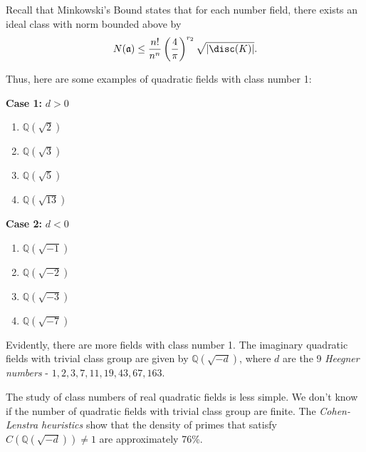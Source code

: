 \documentclass[a4paper, 12pt,oneside,openany]{book}
\begin{document}
Recall that Minkowski's Bound states that for each number field, there exists an ideal class with norm bounded above by $$N(\mathfrak{a})\leq\frac{n!}{n^n}\left(\frac{4}{\pi}\right)^{r_2} \sqrt{|\disc(K)|}.$$

Thus, here are some examples of quadratic fields with class number 1:

\textbf{Case 1:} $d>0$
\begin{enumerate}
    \item $\mathbb{Q}(\sqrt{2})$
    \item $\mathbb{Q}(\sqrt{3})$
    \item $\mathbb{Q}(\sqrt{5})$
    \item $\mathbb{Q}(\sqrt{13})$
\end{enumerate}

\textbf{Case 2:} $d<0$
\begin{enumerate}
    \item $\mathbb{Q}(\sqrt{-1})$
    \item $\mathbb{Q}(\sqrt{-2})$
    \item $\mathbb{Q}(\sqrt{-3})$
    \item $\mathbb{Q}(\sqrt{-7})$
\end{enumerate}

Evidently, there are more fields with class number 1. The imaginary quadratic fields with trivial class group are given by $\mathbb{Q}(\sqrt{-d})$, where $d$ are the 9 \emph{Heegner numbers} - $1, 2, 3, 7, 11, 19, 43, 67, 163.$

The study of class numbers of real quadratic fields is less simple. We don't know if the number of quadratic fields with trivial class group are finite. The \emph{Cohen-Lenstra heuristics} show that the density of primes that satisfy $C(\mathbb{Q}(\sqrt{-d})) \neq 1$ are approximately 76\%.
\end{document}

